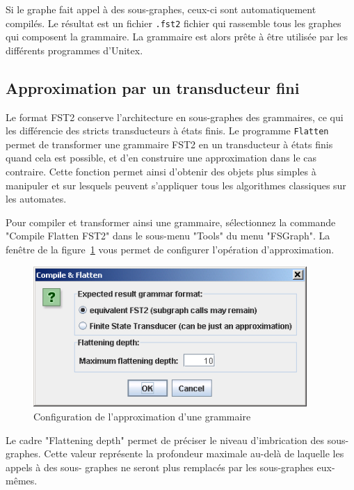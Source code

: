 \noindent Si le graphe fait appel à des sous-graphes, ceux-ci sont automatiquement compilés. Le
résultat est un fichier \verb+.fst2+ fichier qui rassemble tous les
graphes qui composent la grammaire. La grammaire est alors prête à être utilisée par les
différents programmes d’Unitex.


\subsection{Approximation par un transducteur fini}
\label{flatten-section}
Le format FST2 conserve l’architecture en sous-graphes des grammaires, ce qui les différencie
des stricts transducteurs à états finis. Le programme \verb+Flatten+ permet de transformer
une grammaire FST2 en un transducteur à états finis quand cela est possible, et d’en
construire une approximation dans le cas contraire. Cette fonction permet ainsi d’obtenir des objets
plus simples à manipuler et sur lesquels peuvent s’appliquer tous les algorithmes classiques sur
les automates.


\bigskip
\noindent Pour compiler et transformer ainsi une grammaire, sélectionnez la commande "Compile
Flatten FST2" dans le sous-menu "Tools" du menu "FSGraph". La fenêtre de la figure~\ref{fig-flatten-configuration}
vous permet de configurer l’opération d’approximation.

\bigskip
\begin{figure}[!ht]
\begin{center}
\includegraphics[width=10.4cm]{resources/img/fig6-5.png}
\caption{Configuration de l’approximation d’une grammaire\label{fig-flatten-configuration}}
\end{center}
\end{figure}

\noindent Le cadre "Flattening depth" permet de préciser le niveau d’imbrication des sous-graphes.
Cette valeur représente la profondeur maximale au-delà de laquelle les appels à des sous-
graphes ne seront plus remplacés par les sous-graphes eux-mêmes.


